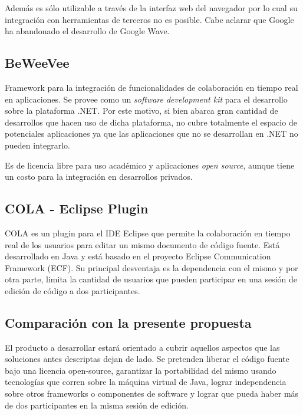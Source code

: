 \documentclass[12pt,a4paper]{article}
\begin{document}
Además es sólo utilizable a través de la interfaz web del navegador por lo cual su integración con
herramientas de terceros no es posible. Cabe aclarar que Google ha abandonado el desarrollo de Google Wave.

	\subsection{BeWeeVee \cite{beweevee}}

Framework para la integración de funcionalidades de colaboración en tiempo real en aplicaciones.
Se provee como un \textit{software development kit} para el desarrollo sobre la plataforma .NET.
Por este motivo, si bien abarca gran cantidad de desarrollos que hacen uso de dicha plataforma, no
cubre totalmente el espacio de potenciales aplicaciones ya que las aplicaciones que no se desarrollan en
.NET no pueden integrarlo.

Es de licencia libre para uso académico y aplicaciones \textit{open source}, aunque tiene un costo para
la integración en desarrollos privados.

	\subsection{COLA \cite{cola} - Eclipse Plugin}

COLA es un plugin para el IDE Eclipse que permite la colaboración en tiempo real de los usuarios para editar
un mismo documento de código fuente. Está desarrollado en Java y está basado en el proyecto Eclipse Communication
Framework (ECF). Su principal desventaja es la dependencia con el mismo y por otra parte, limita la cantidad
de usuarios que pueden participar en una sesión de edición de código a dos participantes.

	\subsection{Comparación con la presente propuesta}
El producto a desarrollar estará orientado a cubrir aquellos aspectos que las soluciones antes descriptas
dejan de lado. Se pretenden liberar el código fuente bajo una licencia open-source, garantizar la portabilidad del
mismo usando tecnologías que corren sobre la máquina virtual de Java, lograr independencia sobre otros frameworks
o componentes de software y lograr que pueda haber más de dos participantes en la misma sesión de edición.
\end{document}
